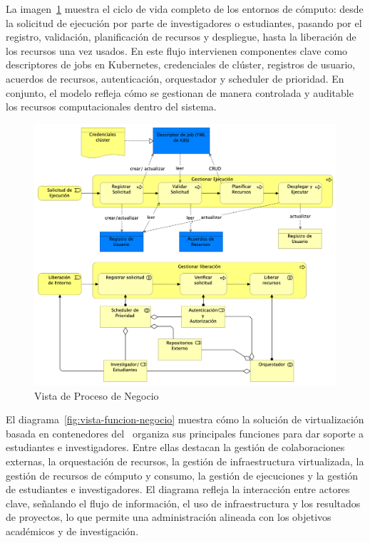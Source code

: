 \noindent
La imagen~\ref{fig:vista-proceso-negocio} muestra el ciclo de vida completo de los entornos de cómputo: desde la solicitud de ejecución por parte de investigadores o estudiantes, pasando por el registro, validación, planificación de recursos y despliegue, hasta la liberación de los recursos una vez usados. En este flujo intervienen componentes clave como descriptores de jobs en Kubernetes, credenciales de clúster, registros de usuario, acuerdos de recursos, autenticación, orquestador y scheduler de prioridad. En conjunto, el modelo refleja cómo se gestionan de manera controlada y auditable los recursos computacionales dentro del sistema.
\begin{figure}[H]
    \centering
    \includegraphics[width=\textwidth]{tablas-images/cp6/Business-Process-View.png}
    \caption{Vista de Proceso de Negocio}\label{fig:vista-proceso-negocio}
\end{figure}
\noindent
El diagrama~\ref{fig:vista-funcion-negocio} muestra cómo la solución de virtualización basada en contenedores del \GRID\ organiza sus principales funciones para dar soporte a estudiantes e investigadores. Entre ellas destacan la gestión de colaboraciones externas, la orquestación de recursos, la gestión de infraestructura virtualizada, la gestión de recursos de cómputo y consumo, la gestión de ejecuciones y la gestión de estudiantes e investigadores. El diagrama refleja la interacción entre actores clave, señalando el flujo de información, el uso de infraestructura y los resultados de proyectos, lo que permite una administración alineada con los objetivos académicos y de investigación.

